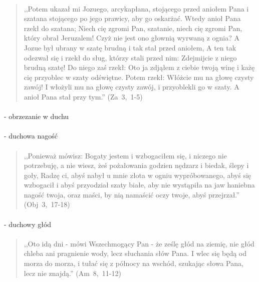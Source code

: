 \documentclass[10pt,a4paper,oneside]{article}
\begin{document}
\paragraph{}
\begin{quote}
,,Potem ukazał mi Jozuego, arcykapłana, stojącego przed aniołem Pana i szatana stojącego po jego prawicy, aby go oskarżać. Wtedy anioł Pana rzekł do szatana; Niech cię zgromi Pan, szatanie, niech cię zgromi Pan, który obrał Jeruzalem! Czyż nie jest ono głownią wyrwaną z ognia? A Jozue był ubrany w szatę brudną i tak stał przed aniołem, A ten tak odezwał się i rzekł do sług, którzy stali przed nim: Zdejmijcie z niego brudną szatę! Do niego zaś rzekł: Oto ja zdjąłem z ciebie twoją winę i każę cię przyoblec w szaty odświętne. Potem rzekł: Włóżcie mu na głowę czysty zawój! I włożyli mu na głowę czysty zawój, i przyoblekli go w szaty. A anioł Pana stał przy tym.'' \mbox{(Za 3, 1-5)}
\end{quote}
\paragraph{}
- obrzezanie w duchu
\paragraph{}
- duchowa nagość
\paragraph{}
\begin{quote}
,,Ponieważ mówisz: Bogaty jestem i wzbogaciłem się, i niczego nie potrzebuję, a nie wiesz, żeś pożałowania godzien nędzarz i biedak, ślepy i goły, Radzę ci, abyś nabył u mnie złota w ogniu wypróbowanego, abyś się wzbogacił i abyś przyodział szaty białe, aby nie wystąpiła na jaw haniebna nagość twoja, oraz maści, by nią namaścić oczy twoje, abyś przejrzał.'' \mbox{(Obj 3, 17-18)}
\end{quote}
\paragraph{}
- duchowy głód
\paragraph{}
\begin{quote}
,,Oto idą dni - mówi Wszechmogący Pan - że ześlę głód na ziemię, nie głód chleba ani pragnienie wody, lecz słuchania słów Pana. I wlec się będą od morza do morza, i tułać się z północy na wschód, szukając słowa Pana, lecz nie znajdą.'' \mbox{(Am 8, 11-12)}
\end{quote}
\end{document}
